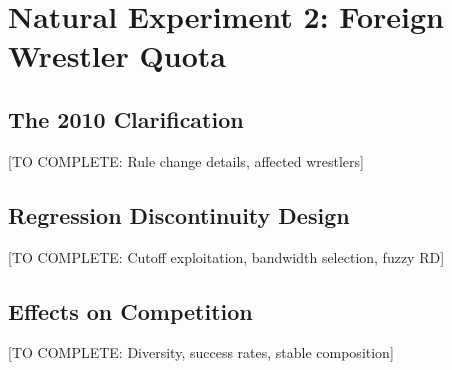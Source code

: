 \section{Natural Experiment 2: Foreign Wrestler Quota}

\subsection{The 2010 Clarification}

[TO COMPLETE: Rule change details, affected wrestlers]

\subsection{Regression Discontinuity Design}

[TO COMPLETE: Cutoff exploitation, bandwidth selection, fuzzy RD]

\subsection{Effects on Competition}

[TO COMPLETE: Diversity, success rates, stable composition]